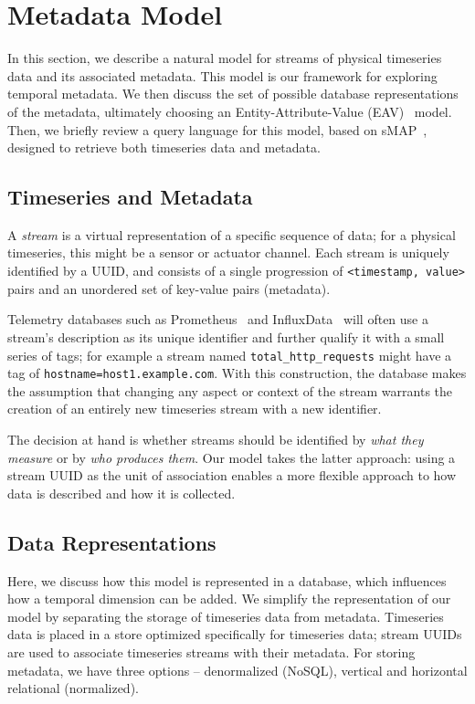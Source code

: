 \section{Metadata Model}

In this section, we describe a natural model for streams of physical timeseries
data and its associated metadata. This model is our framework for exploring
temporal metadata. We then discuss the set of possible database representations
of the metadata, ultimately choosing an Entity-Attribute-Value
(EAV)~\cite{chen1976entity} model. Then, we briefly review a query language for
this model, based on sMAP~\cite{dawson2010smap}, designed to retrieve both
timeseries data and metadata.


\subsection{Timeseries and Metadata}

A \emph{stream} is a virtual representation of a specific sequence of data; for
a physical timeseries, this might be a sensor or actuator channel. Each stream
is uniquely identified by a UUID, and consists of a single progression of
\texttt{<timestamp, value>} pairs and an unordered set of key-value pairs
(metadata).

Telemetry databases such as Prometheus~\cite{prometheus} and
InfluxData~\cite{influxdata} will often use a stream's description as its
unique identifier and further qualify it with a small series of tags; for
example a stream named \texttt{total\_http\_requests} might have a tag of
\texttt{hostname=host1.example.com}. With this construction, the database makes
the assumption that changing any aspect or context of the stream warrants the
creation of an entirely new timeseries stream with a new identifier.

The decision at hand is whether streams should be identified by \emph{what they
measure} or by \emph{who produces them}. Our model takes the latter approach:
using a stream UUID as the unit of association enables a more flexible approach
to how data is described and how it is collected.

\subsection{Data Representations}

Here, we discuss how this model is represented in a database, which influences
how a temporal dimension can be added. We simplify the representation of our
model by separating the storage of timeseries data from metadata. Timeseries
data is placed in a store optimized specifically for timeseries data; stream
UUIDs are used to associate timeseries streams with their metadata. For
storing metadata, we have three options -- denormalized (NoSQL), vertical
and horizontal relational (normalized).

